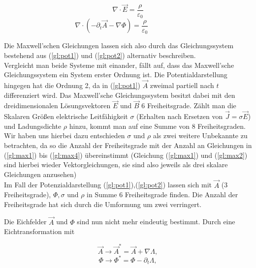 \begin{equation*}
\nabla \cdot \vec{E} = \frac{\rho}{\varepsilon_0} 
\end{equation*}
\begin{equation}
\label{gl:pot2}
\nabla \cdot (-\partial_t\vec{A} - \nabla\Phi) = \frac{\rho}{\varepsilon_0} \hspace{2cm}
\end{equation}

Die Maxwell'schen Gleichungen lassen sich also durch das Gleichungssystem bestehend aus (\ref{gl:pot1}) und (\ref{gl:pot2})
alternativ beschreiben.\\
Vergleicht man beide Systeme mit einander, fällt auf, dass das Maxwell'sche Gleichungssystem ein System erster Ordnung ist. Die Potentialdarstellung hingegen hat die Ordnung 2, da in (\ref{gl:pot1}) $\vec{A}$ zweimal partiell nach $t$ differenziert wird.
Das  Maxwell'sche Gleichungssystem besitzt dabei mit den dreidimensionalen Lösungsvektoren $\vec{E}$ und $\vec{B}$ 6 Freiheitsgrade. Zählt man die Skalaren Größen elektrische Leitfähigkeit $\sigma$ (Erhalten nach Ersetzen von $\vec{J}=\sigma\vec{E}$) und Ladungsdichte $\rho$ hinzu, kommt man auf eine Summe von 8 Freiheitsgraden. Wir haben uns hierbei dazu entschieden $\sigma$ und $\rho$ als zwei weitere Unbekannte zu betrachten, da so die Anzahl der Freiheitsgrade mit der Anzahl an Gleichungen in (\ref{gl:max1}) bis (\ref{gl:max4}) übereinstimmt (Gleichung (\ref{gl:max1}) und (\ref{gl:max2}) sind hierbei wieder Vektorgleichungen, sie sind also jeweils als drei skalare Gleichungen anzusehen)\\
Im Fall der Potenzialdarstellung (\ref{gl:pot1}),(\ref{gl:pot2}) lassen sich mit $\vec{A}$ (3 Freiheitsgrade), $\Phi, \sigma$ und $\rho$ in Summe 6 Freiheitsgrade finden. Die Anzahl der Freiheitsgrade hat sich durch die Umformung um zwei verringert.

\newpage

Die Eichfelder $\vec{A}$ und $\Phi$ sind nun nicht mehr eindeutig bestimmt. Durch eine Eichtransformation mit 

\begin{equation*}
\vec{A}\rightarrow \vec{A}^* = \vec{A} + \nabla\Lambda,
\end{equation*}
\begin{equation*}
\Phi\rightarrow \Phi^* = \Phi - \partial_t\Lambda,
\end{equation*}

